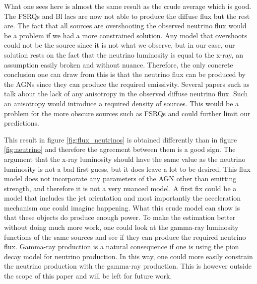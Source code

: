 What one sees here is almost the same result as the crude average which is good. The FSRQs and Bl lacs are now not able to produce the diffuse flux but the rest are. 
The fact that all sources are overshooting the observed neutrino flux would be a problem if we had a more constrained solution. Any model that overshoots could not be the source since it is not what we observe, but in our case, 
our solution rests on the fact that the neutrino luminosity is equal to the x-ray, an assumption easily broken and without nuance. Therefore, the only concrete conclusion one can draw from this is that the neutrino flux can be produced by the AGNs since they can produce the required emissivity.
Several papers such as \cite{Kurahashi_2022} talk about the lack of any anisotropy in the observed diffuse neutrino flux. Such an anisotropy would introduce a required density of sources. This would be a problem for the more obscure sources such as FSRQs and could further limit our predictions.

This result in figure \ref*{fig:flux_neutrinos} is obtained differently than in figure \ref*{fig:neutrino} and therefore the agreement between them is a good sign. The argument that the x-ray luminosity should have the same value as the neutrino luminosity is not a bad first guess, but it does leave a lot to be desired. 
This flux model does not incorporate any parameters of the AGN other than emitting strength, and therefore it is not a very nuanced model. A first fix could be a model that includes the jet orientation and most importantly the acceleration mechanism one could imagine happening. What this 
crude model can show is that these objects do produce enough power. To make the estimation better without doing much more work, one could look at the gamma-ray luminosity functions of the same sources and see if they can produce the required neutrino flux. Gamma-ray production is a natural consequence if one is using the pion decay model
for neutrino production. In this way, one could more easily constrain the neutrino production with the gamma-ray production. 
This is however outside the scope of this paper and will be left for future work. 


